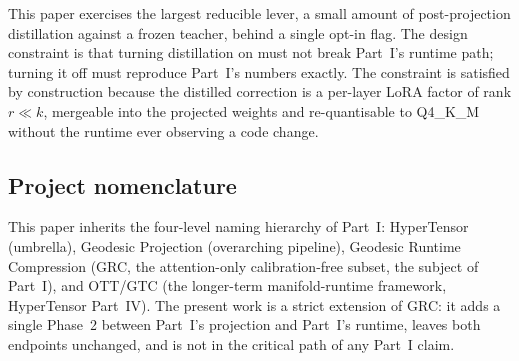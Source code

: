 \documentclass[11pt]{article}
\begin{document}
This paper exercises the largest reducible lever, a small amount of
post-projection distillation against a frozen teacher, behind a single
opt-in flag. The design constraint is that turning distillation on must
not break Part~I's runtime path; turning it off must reproduce
Part~I's numbers exactly. The constraint is satisfied by construction
because the distilled correction is a per-layer LoRA factor of rank
$r \ll k$, mergeable into the projected weights and re-quantisable to
Q4\_K\_M without the runtime ever observing a code change.

\subsection{Project nomenclature}
This paper inherits the four-level naming hierarchy of Part~I:
HyperTensor (umbrella), Geodesic Projection (overarching pipeline),
Geodesic Runtime Compression (GRC, the attention-only calibration-free
subset, the subject of Part~I), and OTT/GTC (the longer-term
manifold-runtime framework, HyperTensor Part~IV). The present work is a strict
extension of GRC: it adds a single Phase~2 between Part~I's projection
and Part~I's runtime, leaves both endpoints unchanged, and is not in
the critical path of any Part~I claim.
\end{document}
